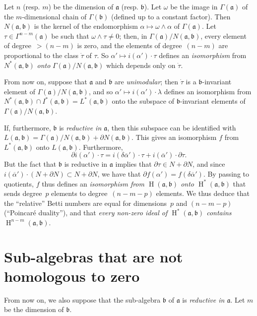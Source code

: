 \documentclass{article}
\newcommand{\fk}{\mathfrak}
\DeclareMathOperator{\HH}{H}
\newcommand{\oldpage}[1]{\marginpar{\footnotesize$\Big\vert$ \textit{p.~#1}}}
\begin{document}
Let $n$ (resp. $m$) be the dimension of $\fk{a}$ (resp. $\fk{b}$).
Let $\omega$ be the image in $\Gamma(\fk{a})$ of the $m$-dimensional chain of $\Gamma(\fk{b})$ (defined up to a constant factor).
Then $N(\fk{a},\fk{b})$ is the kernel of the endomorphism $\alpha\mapsto\omega\wedge\alpha$ of $\Gamma(\fk{a})$.
Let $\tau\in\Gamma^{n-m}(\fk{a})$ be such that $\omega\wedge\tau\neq0$;
then, in $\Gamma(\fk{a})/N(\fk{a},\fk{b})$, every element of degree~$>(n-m)$ is zero, and the elements of degree~$(n-m)$ are proportional to the class $\dot{\tau}$ of $\tau$.
So $\alpha'\mapsto i(\alpha')\cdot\tau$ defines an \emph{isomorphism} from $N^*(\fk{a},\fk{b})$ \emph{onto} $\Gamma(\fk{a})/N(\fk{a},\fk{b})$ which depends only on $\dot{\tau}$.

From now on, suppose that $\fk{a}$ and $\fk{b}$ are \emph{unimodular};
then $\dot{\tau}$ is a $\fk{b}$-invariant element of $\Gamma(\fk{a})/N(\fk{a},\fk{b})$, and so $\alpha'\mapsto i(\alpha')\cdot\lambda$ defines an isomorphism from $N^*(\fk{a},\fk{b})\cap I^*(\fk{a},\fk{b}) = L^*(\fk{a},\fk{b})$ onto the subspace of $\fk{b}$-invariant elements of $\Gamma(\fk{a})/N(\fk{a},\fk{b})$.

If, furthermore, $\fk{b}$ is \emph{reductive in $\fk{a}$}, then this subspace can be identified with $L(\fk{a},\fk{b}) = \Gamma(\fk{a})/N(\fk{a},\fk{b})+\partial N(\fk{a},\fk{b})$.
This gives an isomorphism $f$ from $L^*(\fk{a},\fk{b})$ onto $L(\fk{a},\fk{b})$.
Furthermore,
\[
  \partial i(\alpha')\cdot\tau
  = i(\delta\overline{\alpha}')\cdot\tau + i(\overline{\alpha}')\cdot\partial\tau.
\]
But the fact that $\fk{b}$ is reductive in $\fk{a}$ implies that $\partial\tau\in N+\partial N$, and since $i(\overline{\alpha}')\cdot(N+\partial N)\subset N+\partial N$, we have that $\partial f(\alpha')=f(\delta\overline{\alpha}')$.
By passing to quotients, $f$ thus defines an \emph{isomorphism from $\HH(\fk{a},\fk{b})$ onto $\HH^*(\fk{a},\fk{b})$} that
\oldpage{74}
sends degree~$p$ elements to degree~$(n-m-p)$ elements.
We thus deduce that the ``relative'' Betti numbers are equal for dimensions~$p$ and $(n-m-p)$ (``Poincar\'{e} duality''), and that \emph{every non-zero ideal of $\HH^*(\fk{a},\fk{b})$ contains $\HH^{n-m}(\fk{a},\fk{b})$}.


\section{Sub-algebras that are not homologous to zero}
\label{III.4}

From now on, we also suppose that the sub-algebra $\fk{b}$ of $\fk{a}$ is \emph{reductive in $\fk{a}$}.
Let $m$ be the dimension of $\fk{b}$.
\end{document}
